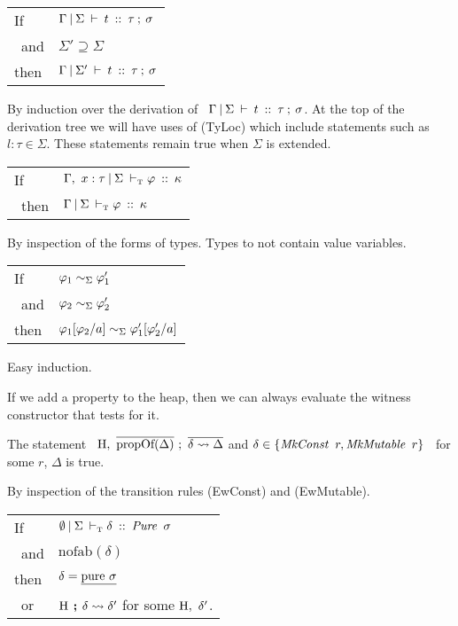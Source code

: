 \medskip
\begin{tabular}{ll}
	If 	& $\Gamma \: \arrowvert \: \Sigma \: \vdash \: t \: :: \: \tau \: ; \: \sigma$ 	\\
	\ and	& $\Sigma' \supseteq \Sigma$			\\[1ex]
	then	& $\Gamma \: \arrowvert \: \Sigma' \: \vdash \: t \: :: \: \tau \: ; \: \sigma$
\end{tabular}
\medskip

By induction over the derivation of \ $\Gamma \: \arrowvert \: \Sigma \: \vdash \: t \: :: \: \tau \: ; \: \sigma$. At the top of the
derivation tree we will have uses of (TyLoc) which include statements such as $l : \tau \in \Sigma$. 
These statements remain true when $\Sigma$ is extended.



\medskip
\begin{tabular}{ll}
	If	& $\Gamma, \ x : \tau \: \arrowvert \: \Sigma \: \vdash_\textrm{\tiny{T}}\varphi \: :: \: \kappa$ \\
	 \ then	& $\Gamma \: \arrowvert \: \Sigma \: \vdash_\textrm{\tiny{T}}\varphi \: :: \: \kappa$
\end{tabular}
\medskip

By inspection of the forms of types. Types to not contain value variables.



\begin{tabular}{ll}
	If	& $\varphi_1 \sim_\Sigma \varphi_1'$ \\
	 \ and	& $\varphi_2 \sim_\Sigma \varphi_2'$ 
	\\[1ex]
	then	& $\varphi_1[\varphi_2/a] \sim_\Sigma \varphi_1'[\varphi_2'/a]$
\end{tabular}

Easy induction.



If we add a property to the heap, then we can always evaluate the witness constructor that
tests for it. 

The statement \ $\heap, \ \ov{\trm{propOf}(\Delta)} \ ; \ \ov{\delta \leadsto \Delta}$ 
	and $\delta \in \{ \operatorname{\mathit{MkConst}} \ r, \operatorname{\mathit{MkMutable}} \ r \}$ \ for some $r$, $\Delta$ is true.

By inspection of the transition rules (EwConst) and (EwMutable).

\clearpage{}

\begin{tabular}{ll}
	If 	& $\kiJudge{\emptyset}{\Sigma}{\delta}{\iPure \ \sigma}$ \\
	 \ and 	& $\text{nofab}(\delta)$ \\
	then 	& $\delta = \underline{\textrm{pure} \ \sigma}$ \\
 	 \ or	& $\textrm{H} \hspace{4pt} \textbf{;} \hspace{4pt} \delta \leadsto \delta'$ for some $\textrm{H}, \ \delta'$.
\end{tabular}

